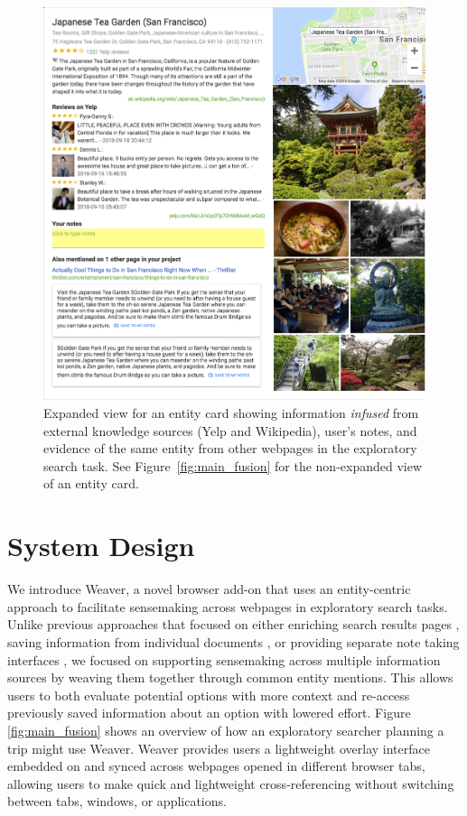 \begin{figure}
    \centering
    \includegraphics[width=1.0\columnwidth]{Chapters/Weaver/expanded.png}
    \caption[Expanded view for an entity card.]{Expanded view for an entity card showing information \emph{infused} from external knowledge sources (Yelp and Wikipedia), user's notes, and evidence of the same entity from other webpages in the exploratory search task. See Figure~\ref{fig:main_fusion} for the non-expanded view of an entity card.}
    \label{fig:expanded_fusion}
\end{figure}


\section{System Design}

We introduce Weaver, a novel browser add-on that uses an entity-centric approach to facilitate sensemaking across webpages in exploratory search tasks. 
Unlike previous approaches that focused on either enriching search results pages \cite{syed2017optimizing,miliaraki2015selena}, saving information from individual documents \cite{tashman2011liquidtext,thresher}, or providing separate note taking interfaces \cite{dontcheva2007relations}, we focused on supporting sensemaking across multiple information sources by weaving them together through common entity mentions. This allows users to both evaluate potential options with more context and re-access previously saved information about an option with lowered effort.
Figure \ref{fig:main_fusion} shows an overview of how an exploratory searcher planning a trip might use Weaver. Weaver provides users a lightweight overlay interface embedded on and synced across webpages opened in different browser tabs, allowing users to make quick and lightweight cross-referencing without switching between tabs, windows, or applications.

